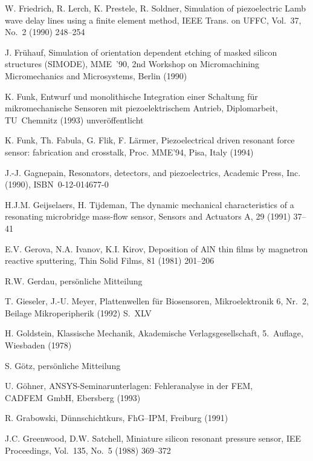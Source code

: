 \begin{thebibliography}{xxx}
 W. Friedrich, R. Lerch, K. Prestele, R. Soldner, Simulation of
 piezoelectric Lamb wave delay lines using a finite element method,
 IEEE Trans. on UFFC, Vol.~37, No.~2 (1990) 248--254

 J. Frühauf, Simulation of orientation dependent etching of masked silicon
 structures ({\sf SIMODE}), MME~'90, 2nd Workshop on Micromachining
 Micromechanics and Microsystems, Berlin (1990)

 K. Funk, Entwurf und monolithische Integration einer Schaltung für
 mikromechanische Sensoren mit piezoelektrischem Antrieb, Diplomarbeit,
 TU~Chemnitz (1993) unveröffentlicht

 K. Funk, Th. Fabula, G. Flik, F. Lärmer,
 Piezoelectrical driven resonant force sensor: fabrication and crosstalk,
 Proc. MME'94, Pisa, Italy (1994)

  J.-J. Gagnepain, Resonators, detectors, and piezoelectrics, Academic Press,
 Inc. (1990), ISBN~0-12-014677-0

 H.J.M. Geijselaers, H. Tijdeman, The dynamic mechanical characteristics of
 a resonating microbridge mass-flow sensor, Sensors and Actuators A, 29
 (1991) 37--41

 E.V. Gerova, N.A. Ivanov, K.I. Kirov, Deposition of AlN thin films by
 magnetron reactive sputtering, Thin Solid Films, 81 (1981) 201--206

 R.W. Gerdau, persönliche Mitteilung

 T. Gieseler, J.-U. Meyer, Plattenwellen für Biosensoren, Mikroelektronik 6,
 Nr.~2, Beilage Mikroperipherik (1992) S.~XLV

 H. Goldstein, Klassische Mechanik, Akademische Verlagsgesellschaft,
 5.~Auflage, Wiesbaden (1978)

 S. Götz, persönliche Mitteilung

 U. Göhner, {\sf ANSYS}-Seminarunterlagen: Fehleranalyse in der FEM,
 CADFEM~GmbH, Ebersberg (1993)

 R. Grabowski, Dünnschichtkurs, FhG--IPM, Freiburg (1991)

 J.C. Greenwood, D.W. Satchell, Miniature silicon resonant pressure sensor,
 IEE Proceedings, Vol.~135, No.~5 (1988) 369--372


\end{thebibliography}

